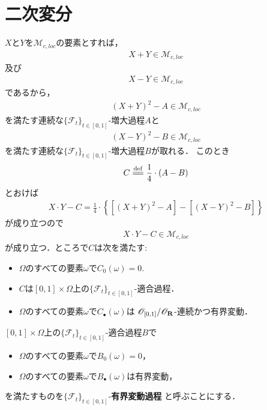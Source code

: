 \section{二次変分}
	$X$と$Y$を$\mathscr{M}_{c,loc}$の要素とすれば，
	\begin{align}
		X + Y \in \mathscr{M}_{c,loc}
	\end{align}
	及び
	\begin{align}
		X - Y \in \mathscr{M}_{c,loc}
	\end{align}
	であるから，
	\begin{align}
		(X + Y)^{2} - A \in \mathscr{M}_{c,loc}
	\end{align}
	を満たす連続な$\{\mathscr{F}_t\}_{t \in [0,1]}$-増大過程$A$と
	\begin{align}
		(X - Y)^{2} - B \in \mathscr{M}_{c,loc}
	\end{align}
	を満たす連続な$\{\mathscr{F}_t\}_{t \in [0,1]}$-増大過程$B$が取れる．
	このとき
	\begin{align}
		C \defeq \frac{1}{4} \cdot (A - B)
	\end{align}
	とおけば
	\begin{align}
		X \cdot Y - C = \frac{1}{4} \cdot 
		\left\{ \left[(X + Y)^{2} - A\right] - \left[(X - Y)^{2} - B\right] \right\}
	\end{align}
	が成り立つので
	\begin{align}
		X \cdot Y - C \in \mathscr{M}_{c,loc}
	\end{align}
	が成り立つ．ところで$C$は次を満たす:
	\begin{itemize}
		\item $\Omega$のすべての要素$\omega$で$C_{0}(\omega) = 0$.
		\item $C$は$[0,1] \times \Omega$上の$\{\mathscr{F}_{t}\}_{t \in [0,1]}$-適合過程．
		\item $\Omega$のすべての要素$\omega$で$C_{\bullet}(\omega)$は
			$\mathscr{O}_{[0,1]}/\mathscr{O}_{\mathbf{R}}$-連続かつ有界変動．
	\end{itemize}
	
	\begin{screen}
		\begin{dfn}[有界変動過程]
			$[0,1] \times \Omega$上の$\{\mathscr{F}_{t}\}_{t \in [0,1]}$-適合過程$B$で
			\begin{itemize}
				\item $\Omega$のすべての要素$\omega$で$B_{0}(\omega) = 0$，
				\item $\Omega$のすべての要素$\omega$で$B_{\bullet}(\omega)$は有界変動，
			\end{itemize}
			を満たすものを$\{\mathscr{F}_{t}\}_{t \in [0,1]}$-{\bf 有界変動過程}
			と呼ぶことにする．
		\end{dfn}
	\end{screen}
	
